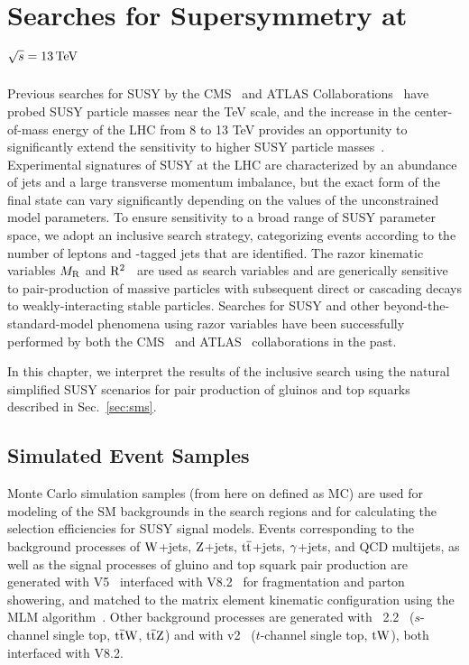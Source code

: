 \chapter{Searches for Supersymmetry at $\sqrt{s}=13\,\text{Te\hspace{-.08em}V}$}
\label{ch:analysis13TeV}
Previous searches for SUSY by the
CMS~\cite{1LepMVA,SUS12024,Chatrchyan:2014lfa,Chatrchyan:2013iqa,Chatrchyan:2013fea,Chatrchyan:2013lya,MT2at8TeV}
and ATLAS Collaborations~\cite{Aad:2013wta,Aad:2014lra,Aad:2014pda,Aad:2014bva,Aad:2014qaa,Atlas3rdGen,Atlas8tevSummary}
have probed SUSY particle masses near the TeV scale, and the increase in the center-of-mass
energy of the LHC from 8 to 13 TeV provides an opportunity to
significantly extend the sensitivity to higher SUSY particle masses~\cite{atlasFullHad13TeV,RA2b13TeV,MT213TeV}.
Experimental signatures of SUSY at the LHC are characterized by an abundance of jets
and a large transverse momentum imbalance, but the exact form of the final state can vary significantly
depending on the values of the unconstrained model parameters. To ensure sensitivity 
to a broad range of SUSY parameter space, we adopt an inclusive search 
strategy, categorizing events according to the number of leptons and \cPqb-tagged jets that are 
identified. The razor kinematic variables $M_\mathrm{R}$ and $\mathrm{R}^2$~\cite{rogan,razorPRL,razorPRD} 
are used as search variables and are generically sensitive to
pair-production of massive particles with subsequent direct or cascading
decays to weakly-interacting stable particles. Searches for SUSY and
other beyond-the-standard-model phenomena using razor variables have been successfully performed by both the 
CMS~\cite{razorPRL,razorPRD,razor8TeV,Khachatryan:2016zcu,Khachatryan:2016reg} and 
ATLAS~\cite{Aad:2012naa,ATLAS-dilepton} 
collaborations in the past.

In this chapter, we interpret the results of the inclusive search using 
the natural simplified SUSY scenarios for pair production of gluinos and top
squarks described in Sec.~\ref{sec:sms}.


\section{Simulated Event Samples}
Monte Carlo simulation samples (from here on defined as MC) are used for modeling of the SM backgrounds
in the search regions and for calculating the selection efficiencies for SUSY signal models.
Events corresponding to the background processes of $\mathrm{W}$+jets, $\mathrm{Z}$+jets, $\mathrm{t}\overline{\mathrm{t}}$+jets, $\gamma$+jets,
and QCD multijets, as well as the signal processes of gluino and top squark
pair production are generated with \MADGRAPH V5~\cite{Alwall:2011uj} interfaced with \PYTHIA
V8.2~\cite{Sjostrand2008852} for fragmentation and parton
showering, and matched to the matrix element kinematic configuration using the MLM
algorithm~\cite{Hoche:2006ph}. Other background processes are generated with
\MATNLO~2.2~\cite{Alwall:2014hca} ($s$-channel single top, $\mathrm{t}\overline{\mathrm{t}}\mathrm{W}$, $\mathrm{t}\overline{\mathrm{t}}\mathrm{Z}$) and 
with \POWHEG v2~\cite{Alioli:2009je, Re:2010bp} ($t$-channel
single top, $\mathrm{t}\mathrm{W}$), both interfaced with \PYTHIA V8.2. 

